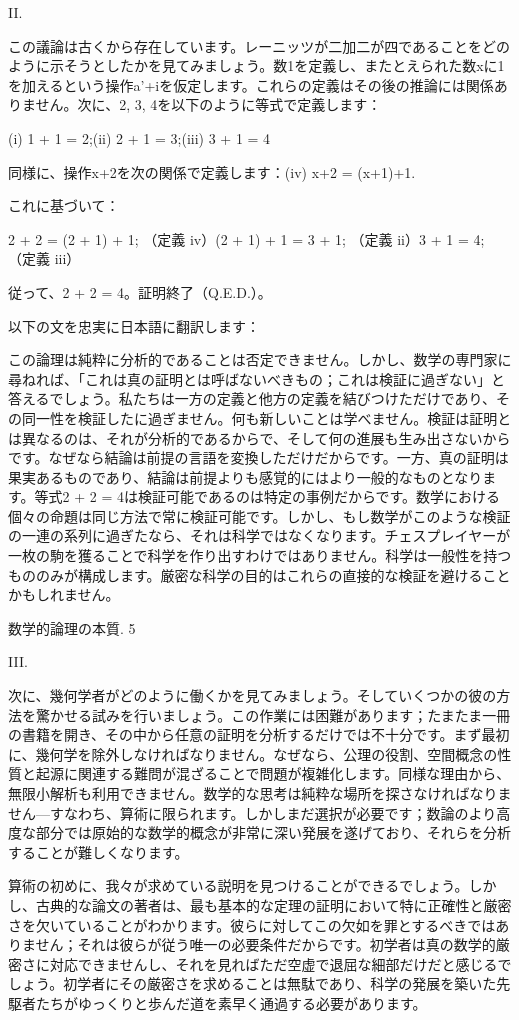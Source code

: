 \documentclass[a4paper,11pt,openany]{ltjsbook}
\begin{document}
II.

この議論は古くから存在しています。レーニッツが二加二が四であることをどのように示そうとしたかを見てみましょう。数1を定義し、またとえられた数xに1を加えるという操作a'+iを仮定します。これらの定義はその後の推論には関係ありません。次に、2, 3, 4を以下のように等式で定義します：

(i) 1 + 1 = 2;(ii) 2 + 1 = 3;(iii) 3 + 1 = 4

同様に、操作x+2を次の関係で定義します：(iv) x+2 = (x+1)+1.

これに基づいて：

2 + 2 = (2 + 1) + 1; （定義 iv）(2 + 1) + 1 = 3 + 1; （定義 ii）3 + 1 = 4; （定義 iii）

従って、2 + 2 = 4。証明終了（Q.E.D.）。

以下の文を忠実に日本語に翻訳します：

この論理は純粋に分析的であることは否定できません。しかし、数学の専門家に尋ねれば、「これは真の証明とは呼ばないべきもの；これは検証に過ぎない」と答えるでしょう。私たちは一方の定義と他方の定義を結びつけただけであり、その同一性を検証したに過ぎません。何も新しいことは学べません。検証は証明とは異なるのは、それが分析的であるからで、そして何の進展も生み出さないからです。なぜなら結論は前提の言語を変換しただけだからです。一方、真の証明は果実あるものであり、結論は前提よりも感覚的にはより一般的なものとなります。等式2 + 2 = 4は検証可能であるのは特定の事例だからです。数学における個々の命題は同じ方法で常に検証可能です。しかし、もし数学がこのような検証の一連の系列に過ぎたなら、それは科学ではなくなります。チェスプレイヤーが一枚の駒を獲ることで科学を作り出すわけではありません。科学は一般性を持つもののみが構成します。厳密な科学の目的はこれらの直接的な検証を避けることかもしれません。

数学的論理の本質. 5

III.

次に、幾何学者がどのように働くかを見てみましょう。そしていくつかの彼の方法を驚かせる試みを行いましょう。この作業には困難があります；たまたま一冊の書籍を開き、その中から任意の証明を分析するだけでは不十分です。まず最初に、幾何学を除外しなければなりません。なぜなら、公理の役割、空間概念の性質と起源に関連する難問が混ざることで問題が複雑化します。同様な理由から、無限小解析も利用できません。数学的な思考は純粋な場所を探さなければなりません—すなわち、算術に限られます。しかしまだ選択が必要です；数論のより高度な部分では原始的な数学的概念が非常に深い発展を遂げており、それらを分析することが難しくなります。

算術の初めに、我々が求めている説明を見つけることができるでしょう。しかし、古典的な論文の著者は、最も基本的な定理の証明において特に正確性と厳密さを欠いていることがわかります。彼らに対してこの欠如を罪とするべきではありません；それは彼らが従う唯一の必要条件だからです。初学者は真の数学的厳密さに対応できませんし、それを見ればただ空虚で退屈な細部だけだと感じるでしょう。初学者にその厳密さを求めることは無駄であり、科学の発展を築いた先駆者たちがゆっくりと歩んだ道を素早く通過する必要があります。
\end{document}
